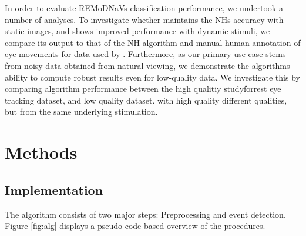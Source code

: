 In order to evaluate REMoDNaVs classification performance, we undertook a number of analyses. To investigate whether \remodnav maintains the NHs accuracy with static images, and shows improved performance with dynamic stimuli, we compare its output to that of the NH algorithm and manual human annotation of eye movements for data used by \cite{Andersson2017}. Furthermore, as our primary use case stems from noisy data obtained from natural viewing, we demonstrate the algorithms ability to compute robust results even for low-quality data. We investigate this by comparing algorithm performance between the high qualitiy studyforrest eye tracking dataset, and low quality dataset.
 with high quality different qualities, but from the same underlying stimulation.



\section*{Methods}\label{methods}


\subsection*{\remodnav Implementation}\label{impl}
 

The algorithm consists of two major steps: Preprocessing and event detection. Figure \ref{fig:alg} displays a pseudo-code based overview of the procedures.


